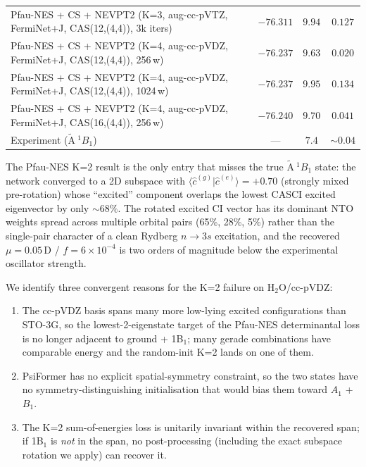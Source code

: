 \documentclass[journal=jctcce,manuscript=suppinfo,layout=traditional]{achemso}
\begin{document}
\begin{table}[h]
\begin{tabular}{lccc}
Pfau-NES + CS + NEVPT2 (K=3, aug-cc-pVTZ, FermiNet+J, CAS(12,(4,4)), 3k iters)
                                & $-76.311$ & $9.94$ & $0.127$ \\
Pfau-NES + CS + NEVPT2 (K=4, aug-cc-pVDZ, FermiNet+J, CAS(12,(4,4)), 256\,w)
                                & $-76.237$ & $9.63$ & $0.020$ \\
Pfau-NES + CS + NEVPT2 (K=4, aug-cc-pVDZ, FermiNet+J, CAS(12,(4,4)), 1024\,w)
                                & $-76.237$ & $9.95$ & $\mathbf{0.134}$ \\
Pfau-NES + CS + NEVPT2 (K=4, aug-cc-pVDZ, FermiNet+J, CAS(16,(4,4)), 256\,w)
                                & $-76.240$ & $9.70$ & $0.041$ \\
\hline
Experiment ($\tilde{\mathrm{A}}\ ^1B_1$) & --- & $7.4$ & $\sim 0.04$ \\
\hline
\end{tabular}
\end{table}

\noindent The Pfau-NES K=2 result is the only entry that misses the
true $\tilde{\mathrm{A}}\ ^1B_1$ state: the network converged to a
2D subspace with $\langle \widehat{c}^{(g)} | \widehat{c}^{(e)} \rangle
= +0.70$ (strongly mixed pre-rotation) whose ``excited'' component
overlaps the lowest CASCI excited eigenvector by only $\sim 68\%$.
The rotated excited CI vector has its dominant NTO weights spread
across multiple orbital pairs (65\%, 28\%, 5\%) rather than the
single-pair character of a clean Rydberg $n\to 3s$ excitation, and
the recovered $\mu = 0.05$\,D / $f = 6\!\times\!10^{-4}$ is two
orders of magnitude below the experimental oscillator strength.

We identify three convergent reasons for the K=2 failure on
H$_2$O/cc-pVDZ:
\begin{enumerate}
\item The cc-pVDZ basis spans many more low-lying excited
configurations than STO-3G, so the lowest-2-eigenstate target of
the Pfau-NES determinantal loss is no longer adjacent to ground +
1B$_1$; many gerade combinations have comparable energy and the
random-init K=2 lands on one of them.
\item PsiFormer has no explicit spatial-symmetry constraint, so
the two states have no symmetry-distinguishing initialisation that
would bias them toward $A_1$ + $B_1$.
\item The K=2 sum-of-energies loss is unitarily invariant within
the recovered span; if 1B$_1$ is \emph{not} in the span, no
post-processing (including the exact subspace rotation we apply)
can recover it.
\end{enumerate}
\end{document}
